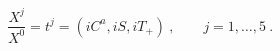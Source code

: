 \begin{equation}\label{variables}
\frac{X^{j}}{X^{0}}=t^{j}=(iC^a,iS,iT_{+})\ ,  \qquad j=1,\ldots,5\ .
\end{equation}

